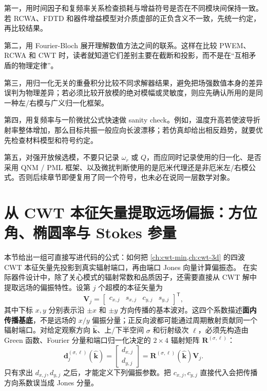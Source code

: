 第一，用时间因子和复频率关系检查损耗与增益符号是否在不同模块间保持一致。若 RCWA、FDTD 和器件增益模型对介质虚部的正负含义不一致，先统一约定，再比较结果。

第二，用 Fourier-Bloch 展开理解数值方法之间的联系。这样在比较 PWEM、RCWA 和 CWT 时，读者就知道它们差别主要在截断和投影，而不是在“互相矛盾的物理定律”。

第三，用归一化无关的重叠积分比较不同求解器结果，避免把场强数值本身的差异误判为物理差异；若必须比较开放模的绝对模幅或灵敏度，则应先确认所用的是同一种左/右模与广义归一化框架。

第四，用复频率与一阶微扰公式快速做 sanity check。例如，温度升高若使波导折射率整体增加，那么目标共振一般应向长波漂移；若仿真却给出相反趋势，就要优先检查材料模型和符号约定。

第五，对强开放候选模，不要只记录 $\omega_r$ 或 $Q$，而应同时记录使用的归一化、是否采用 QNM / PML 框架、以及微扰判断使用的是厄米代理还是非厄米左/右模公式。否则后续章节即便复用了同一个符号，也未必在说同一层数学对象。

\section{从 CWT 本征矢量提取远场偏振：方位角、椭圆率与 Stokes 参量}
\label{sec:cwt-polarization-extraction}
本节给出一组可直接写进代码的公式：如何把 \cref{ch:cwt-min,ch:cwt-3d} 的四波 CWT 本征矢量先投影到真实辐射端口，再由端口 Jones 向量计算偏振态。
在实际器件设计中，除了关心模式的辐射常数和品质因子，还需要直接从 CWT 解中提取远场的偏振特性。设第 $j$ 个超模的本征矢量为
\begin{equation}
\bm V_j = 
\begin{bmatrix}
c_{x,j} & s_{x,j} & c_{y,j} & s_{y,j}
\end{bmatrix}^{\mathsf T},
\end{equation}
其中下标 $x,y$ 分别表示沿 $\pm x$ 和 $\pm y$ 方向传播的基本波对。这四个系数描述\textbf{面内传播基底}，不是远场的 $x/y$ 偏振分量；正反向波都可能通过周期散射贡献同一个辐射端口。对给定观察方向 $\hat{\bm k}$、上/下半空间 $\sigma$ 和衍射级次 $\ell$，必须先构造由 Green 函数、Fourier 分量和端口归一化决定的 $2\times4$ 辐射矩阵 $\bm R^{(\sigma,\ell)}$：
\begin{equation}
\bm d_j^{(\sigma,\ell)}(\hat{\bm k})
=
\begin{bmatrix}d_{x,j}\\d_{y,j}\end{bmatrix}
=
\bm R^{(\sigma,\ell)}(\hat{\bm k})\bm V_j.
\label{eq:cwt-radiation-port-map}
\end{equation}
只有求出 $d_{x,j},d_{y,j}$ 之后，才能定义下列偏振参数。把 $c_{x,j},c_{y,j}$ 直接代入会把传播方向系数误当成 Jones 分量。

